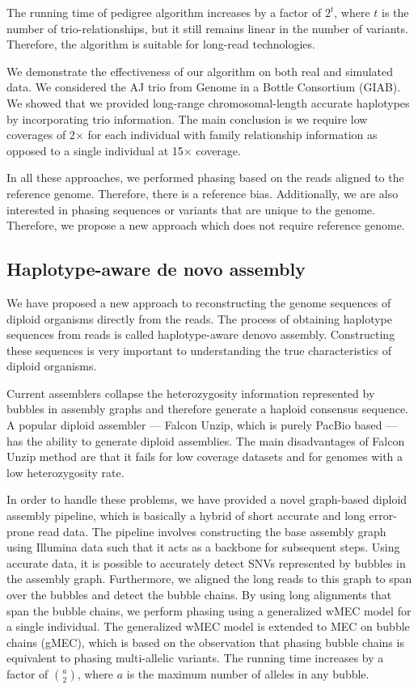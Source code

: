 The running time of pedigree algorithm increases by a factor of $2^t$, where $t$ is the number of trio-relationships, but it still remains linear in the number of variants.
Therefore, the algorithm is suitable for long-read technologies.

We demonstrate the effectiveness of our algorithm on both real and simulated data. We considered the AJ trio from Genome in a Bottle Consortium (GIAB).
We showed that we provided long-range chromosomal-length accurate haplotypes by incorporating trio information.
The main conclusion is we require low coverages of 2$\times$ for each individual with family relationship information as opposed to a single individual at 15$\times$ coverage.

In all these approaches, we performed phasing based on the reads aligned to the reference genome. Therefore, there is a reference bias.
Additionally, we are also interested in phasing sequences or variants that are unique to the genome.
Therefore, we propose a new approach which does not require reference genome.

\subsection{Haplotype-aware de novo assembly}
We have proposed a new approach to reconstructing the genome sequences of diploid organisms directly from the reads.
The process of obtaining haplotype sequences from reads is called haplotype-aware denovo assembly.
Constructing these sequences is very important to understanding the true characteristics of diploid organisms.

Current assemblers collapse the heterozygosity information represented by bubbles in assembly graphs and therefore generate a haploid consensus sequence.
A popular diploid assembler --- Falcon Unzip, which is purely PacBio based --- has the ability to generate diploid assemblies.
The main disadvantages of Falcon Unzip method are that it fails for low coverage datasets and for genomes with a low heterozygosity rate.

In order to handle these problems, we have provided a novel graph-based diploid assembly pipeline, which is basically a hybrid of short accurate and long error-prone read data.
The pipeline involves constructing the base assembly graph using Illumina data such that it acts as a backbone for subsequent steps.
Using accurate data, it is possible to accurately detect SNVs represented by bubbles in the assembly graph.
Furthermore, we aligned the long reads to this graph to span over the bubbles and detect the bubble chains.
By using long alignments that span the bubble chains, we perform phasing using a generalized wMEC model for a single individual.
The generalized wMEC model is extended to MEC on bubble chains (gMEC), which is based on the observation that phasing bubble chains is equivalent to phasing multi-allelic variants.
The running time increases by a factor of $a \choose 2$, where $a$ is the maximum number of alleles in any bubble.

